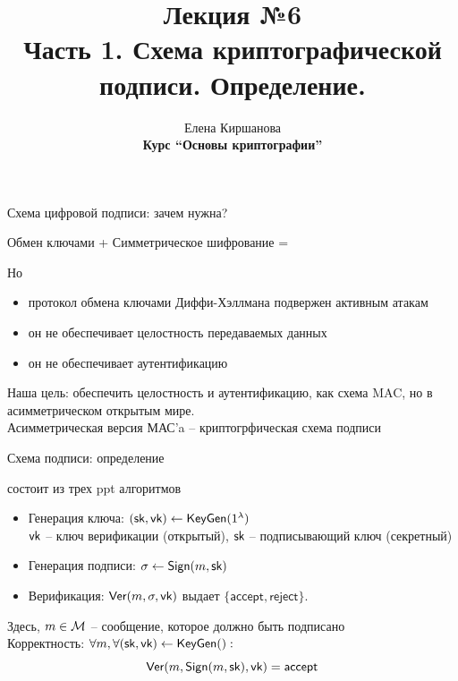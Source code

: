 \documentclass[usenames,dvipsnames,8pt,aspectratio=169]{beamer}
\title{Лекция №6 \\[10pt]
	Часть 1. Схема криптографической подписи. Определение. }
\date{ Елена Киршанова \\  \textbf{Курс ``Основы криптографии''} \\  }
\begin{document}
	
\begin{frame}
	\titlepage
\end{frame}

\begin{frame}{Схема цифровой подписи: зачем нужна?}
	\large 
	\begin{center}
Обмен ключами + Симметрическое шифрование =  {\color{Orange}{конфидециальность} } 
	\end{center}
Но
	\begin{itemize}
		\itemsep 10pt
		\item протокол обмена ключами Диффи-Хэллмана {\color{Orange} подвержен активным атакам} 
		\item  он не обеспечивает {\color{Orange} целостность} передаваемых данных
		\item он не обеспечивает {\color{Orange} аутентификацию}
	\end{itemize}

\vspace{15pt}

Наша цель: обеспечить целостность и аутентификацию, как схема MAC,  но в асимметрическом  {\color{Orange} открытым} мире.\\[10pt]


\Large Асимметрическая версия МАС'a -- {\color{Orange} криптогрфическая схема подписи}
\end{frame}



\begin{frame}{Схема подписи: определение}
\Large

{\color{Orange}{Схема подписи}} состоит из трех ppt алгоритмов
\begin{itemize}
	\itemsep 10pt
	\item Генерация ключа: $(\textsf{sk}, \textsf{vk}) \leftarrow \textsf{KeyGen}(1^\lambda)$ \\
	$\textsf{vk}$ -- ключ верификации (открытый), $\textsf{sk}$ -- подписывающий ключ (секретный)
	\item Генерация подписи: $\sigma \leftarrow \textsf{Sign}(m, \textsf{sk})$
	\item Верификация: $\textsf{Ver}(m, \sigma, \textsf{vk})$ выдает $\{\mathsf{accept}, \mathsf{reject}  \}$.
\end{itemize}
\vspace{15pt}
Здесь,  $m \in \mathcal{M}$ -- сообщение, которое должно быть подписано\\[10pt]

{\color{Orange}Корректность}: $\forall m, \forall (\textsf{sk}, \textsf{vk}) \leftarrow \textsf{KeyGen}():$ 
\[
	\textsf{Ver}(m, \textsf{Sign}(m, \textsf{sk}), \textsf{vk})  = \mathsf{accept}
\]
\end{frame}
\end{document}
